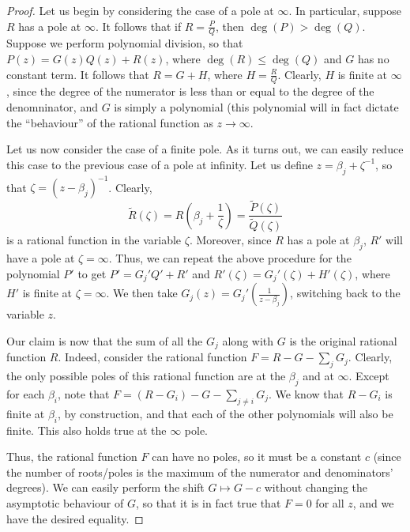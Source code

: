 \documentclass[aps,pra,showpacs,notitlepage,onecolumn,superscriptaddress,nofootinbib]{revtex4-1}
\theoremstyle{definition}
\begin{document}
\begin{proof}
  Let us begin by considering the case of a pole at $\infty$. In particular, suppose $R$ has a pole at $\infty$. It follows that if $R = \frac{P}{Q}$, then $\deg(P) > \deg(Q)$.
  Suppose we perform polynomial division, so that $P(z) = G(z) Q(z) + R(z)$, where $\deg(R) \leq \deg(Q)$ and $G$ has no constant term. It follows that $R = G + H$, where $H = \frac{R}{Q}$.
  Clearly, $H$ is finite at $\infty$, since the degree of the numerator is less than or equal to the degree of the denomninator, and $G$ is simply a polynomial (this polynomial will in fact
  dictate the ``behaviour'' of the rational function as $z \to \infty$.

  Let us now consider the case of a finite pole. As it turns out, we can easily reduce this case to the previous case of a pole at infinity.
  Let us define $z = \beta_j + \zeta^{-1}$, so that $\zeta = (z - \beta_j)^{-1}$. Clearly,
  \begin{equation}
    \widetilde{R}(\zeta) = R\left( \beta_j + \frac{1}{\zeta} \right) = \frac{\widetilde{P}(\zeta)}{\widetilde{Q}(\zeta)}
  \end{equation}
  is a rational function in the variable $\zeta$. Moreover, since $R$ has a pole at $\beta_j$, $R'$ will have a pole at $\zeta = \infty$. Thus, we can repeat the above procedure for the polynomial $P'$
  to get $P' = G_j' Q' + R'$ and $R'(\zeta) = G_j'(\zeta) + H'(\zeta)$, where $H'$ is finite at $\zeta = \infty$. We then take $G_j(z) = G_j'\left(\frac{1}{z - \beta_j}\right)$, switching back to the variable $z$.

  Our claim is now that the sum of all the $G_j$ along with $G$ is the original rational function $R$. Indeed, consider the rational function $F = R - G - \sum_{j} G_j$. Clearly, the only possible poles
  of this rational function are at the $\beta_j$ and at $\infty$. Except for each $\beta_i$, note that $F = (R - G_i) - G - \sum_{j \neq i} G_j$. We know that $R - G_i$ is finite at $\beta_i$, by construction,
  and that each of the other polynomials will also be finite. This also holds true at the $\infty$ pole.

  Thus, the rational function $F$ can have no poles, so it must be a constant $c$ (since the number of roots/poles is the maximum of the numerator and denominators' degrees). We can easily perform the shift $G \mapsto G - c$
  without changing the asymptotic behaviour of $G$, so that it is in fact true that $F = 0$ for all $z$, and we have the desired equality.
  \end{proof}
\end{document}
